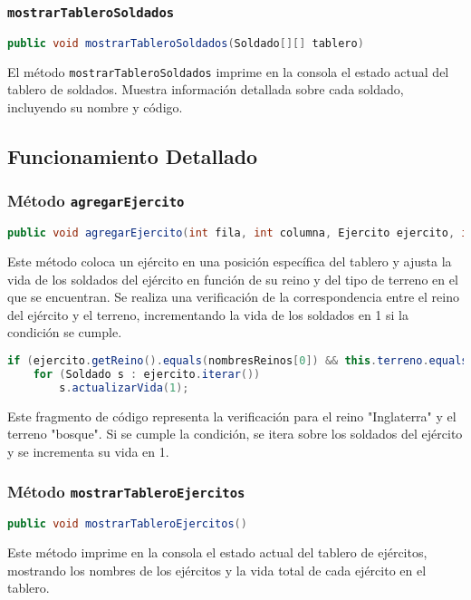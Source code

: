 \subsubsection{\texttt{mostrarTableroSoldados}}
\begin{lstlisting}[language=Java]
public void mostrarTableroSoldados(Soldado[][] tablero)
\end{lstlisting}
El método \texttt{mostrarTableroSoldados} imprime en la consola el estado actual del tablero de soldados. Muestra información detallada sobre cada soldado, incluyendo su nombre y código.

\subsection{Funcionamiento Detallado}

\subsubsection{Método \texttt{agregarEjercito}}
\begin{lstlisting}[language=Java]
public void agregarEjercito(int fila, int columna, Ejercito ejercito, int totalSoldados)
\end{lstlisting}
Este método coloca un ejército en una posición específica del tablero y ajusta la vida de los soldados del ejército en función de su reino y del tipo de terreno en el que se encuentran. Se realiza una verificación de la correspondencia entre el reino del ejército y el terreno, incrementando la vida de los soldados en 1 si la condición se cumple.

\begin{lstlisting}[language=Java]
if (ejercito.getReino().equals(nombresReinos[0]) && this.terreno.equals(terreno[0]))
    for (Soldado s : ejercito.iterar())
        s.actualizarVida(1);
\end{lstlisting}

Este fragmento de código representa la verificación para el reino "Inglaterra" y el terreno "bosque". Si se cumple la condición, se itera sobre los soldados del ejército y se incrementa su vida en 1.

\subsubsection{Método \texttt{mostrarTableroEjercitos}}
\begin{lstlisting}[language=Java]
public void mostrarTableroEjercitos()
\end{lstlisting}
Este método imprime en la consola el estado actual del tablero de ejércitos, mostrando los nombres de los ejércitos y la vida total de cada ejército en el tablero.

